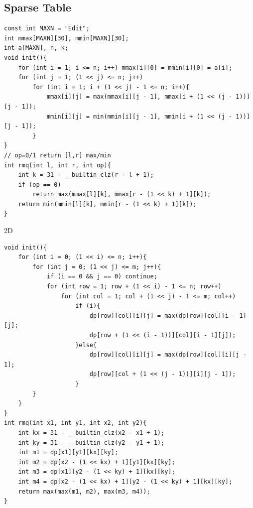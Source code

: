 \documentclass[twoside]{article}
\begin{document}
\subsection{Sparse Table}
\begin{lstlisting}
const int MAXN = "Edit";
int mmax[MAXN][30], mmin[MAXN][30];
int a[MAXN], n, k;
void init(){
    for (int i = 1; i <= n; i++) mmax[i][0] = mmin[i][0] = a[i];
    for (int j = 1; (1 << j) <= n; j++)
        for (int i = 1; i + (1 << j) - 1 <= n; i++){
            mmax[i][j] = max(mmax[i][j - 1], mmax[i + (1 << (j - 1))][j - 1]);
            mmin[i][j] = min(mmin[i][j - 1], mmin[i + (1 << (j - 1))][j - 1]);
        }
}
// op=0/1 return [l,r] max/min
int rmq(int l, int r, int op){
    int k = 31 - __builtin_clz(r - l + 1);
    if (op == 0)
        return max(mmax[l][k], mmax[r - (1 << k) + 1][k]);
    return min(mmin[l][k], mmin[r - (1 << k) + 1][k]);
}
\end{lstlisting}
2D
\begin{lstlisting}
void init(){
    for (int i = 0; (1 << i) <= n; i++){
        for (int j = 0; (1 << j) <= m; j++){
            if (i == 0 && j == 0) continue;
            for (int row = 1; row + (1 << i) - 1 <= n; row++)
                for (int col = 1; col + (1 << j) - 1 <= m; col++)
                    if (i){
                        dp[row][col][i][j] = max(dp[row][col][i - 1][j];
                        dp[row + (1 << (i - 1))][col][i - 1][j]);
                    }else{
                        dp[row][col][i][j] = max(dp[row][col][i][j - 1];
                        dp[row][col + (1 << (j - 1))][i][j - 1]);
                    }
        }
    }
}
int rmq(int x1, int y1, int x2, int y2){
    int kx = 31 - __builtin_clz(x2 - x1 + 1);
    int ky = 31 - __builtin_clz(y2 - y1 + 1);
    int m1 = dp[x1][y1][kx][ky];
    int m2 = dp[x2 - (1 << kx) + 1][y1][kx][ky];
    int m3 = dp[x1][y2 - (1 << ky) + 1][kx][ky];
    int m4 = dp[x2 - (1 << kx) + 1][y2 - (1 << ky) + 1][kx][ky];
    return max(max(m1, m2), max(m3, m4));
}
\end{lstlisting}
\end{document}
